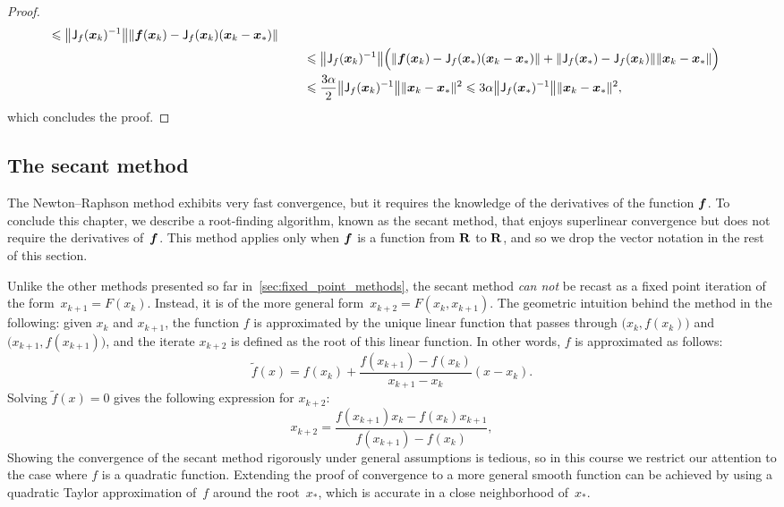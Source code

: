 \begin{proof}
\begin{align*}
         \leq \norm*{\mat J_f(\vect x_k)^{-1}} \norm*{\vect f(\vect x_k) - \mat J_f(\vect x_k) (\vect x_k - \vect x_*) } \\
        &\qquad \leq \norm*{\mat J_f(\vect x_k)^{-1}} \Bigl( \norm{\vect f(\vect x_k) - \mat J_f(\vect x_*) (\vect x_k - \vect x_*) } + \norm{\mat J_f(\vect x_*) - \mat J_f(\vect x_k)} \norm{\vect x_k - \vect x_*} \Bigr) \\
        &\qquad \leq \frac{3 \alpha}{2}\norm*{\mat J_f(\vect x_k)^{-1}} \norm{\vect x_k - \vect x_*}^2
        \leq 3 \alpha \norm*{\mat J_f(\vect x_*)^{-1}} \norm{\vect x_k - \vect x_*}^2,
    \end{align*}
    which concludes the proof.
\end{proof}

\subsection{The secant method~\moreinfo}
The Newton--Raphson method exhibits very fast convergence,
but it requires the knowledge of the derivatives of the function $\mathbf{\boldsymbol{f}}$.
To conclude this chapter,
we describe a root-finding algorithm,
known as the secant method,
that enjoys superlinear convergence but does not require the derivatives of~$\mathbf{\boldsymbol{f}}$.
This method applies only when $\mathbf{\boldsymbol{f}}$ is a function from $\mathbf R$ to $\mathbf R$,
and so we drop the vector notation in the rest of this section.

Unlike the other methods presented so far in~\cref{sec:fixed_point_methods},
the secant method \emph{can not} be recast as a fixed point iteration of the form~$x_{k+1} = F(x_{k})$.
Instead, it is of the more general form~$x_{k+2} = F(x_k, x_{k+1})$.
The geometric intuition behind the method in the following: given $x_k$ and $x_{k+1}$,
the function $f$ is approximated by the unique linear function that passes through $\bigl(x_k, f(x_k)\bigr)$ and
$\bigl(x_{k+1}, f(x_{k+1})\bigr)$,
and the iterate $x_{k+2}$ is defined as the root of this linear function.
In other words, $f$ is approximated as follows:
\[
    \widetilde f(x) = f(x_k) + \frac{f(x_{k+1}) - f(x_k)}{x_{k+1} - x_k} (x - x_k).
\]
Solving $\widetilde f(x) = 0$ gives the following expression for $x_{k+2}$:
\begin{equation}
    \label{eq:secant_method}
    x_{k+2} = \frac{f(x_{k+1}) x_k - f(x_k) x_{k+1}}{f(x_{k+1}) - f(x_k)},
\end{equation}
Showing the convergence of the secant method rigorously under general assumptions is tedious,
so in this course we restrict our attention to the case where $f$ is a quadratic function.
Extending the proof of convergence to a more general smooth function can be achieved
by using a quadratic Taylor approximation of~$f$ around the root~$x_*$,
which is accurate in a close neighborhood of~$x_*$.

